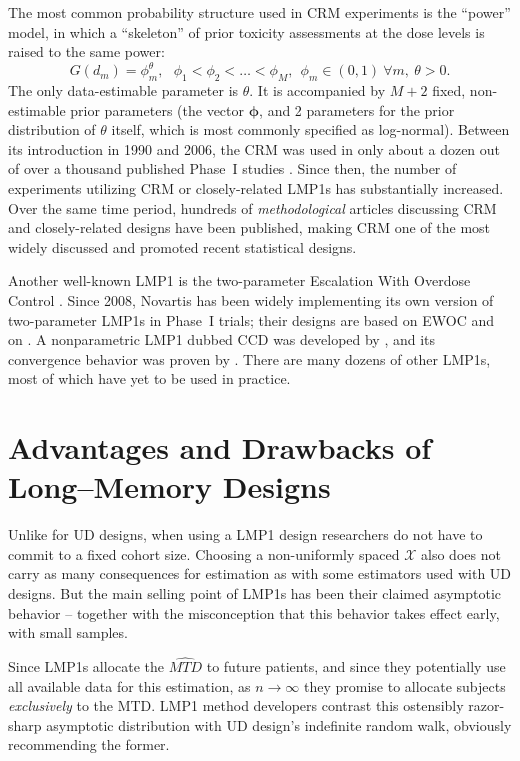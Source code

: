 The most common probability structure used in CRM experiments is the ``power'' model, in which a ``skeleton'' of prior toxicity assessments at the dose levels is raised to the same power:
\begin{equation}\label{eq:crm0}
G\left(d_m\right)=\phi_m^\theta,\ \ \ \phi_1<\phi_2<\ldots <\phi_M ,\ \ \phi_m\in(0,1) \ \forall m,\ \theta>0.
\end{equation}
The only data-estimable parameter is $\theta$. It is accompanied by $M+2$ fixed, non-estimable prior parameters (the vector $\boldsymbol{\phi}$, and 2 parameters for the prior distribution of $\theta$ itself, which is most commonly specified as log-normal). Between its introduction in 1990 and 2006, the CRM was used in only about a dozen out of over a thousand published Phase~I studies \citep{Rogat:etal:oped:2007}. Since then, the number of experiments utilizing CRM or closely-related LMP1s has substantially increased. Over the same time period, hundreds of \emph{methodological} articles discussing CRM and closely-related designs have been published, making CRM one of the most widely discussed and promoted recent statistical designs.

Another well-known LMP1 is the two-parameter Escalation With Overdose Control \citep[EWOC,][]{Babb:Roga:Roga:Zack:canc:1998}. Since 2008, Novartis has been widely implementing its own version of two-parameter LMP1s in Phase~I trials; their designs are based on EWOC and on \cite{Neunsch08}. A nonparametric LMP1 dubbed CCD was developed by \cite{Ivan:Flou:Chun:Cumu:2007}, and its convergence behavior was proven by \cite{oron:azri:hoff:dose:2011}. There are many dozens of other LMP1s, most of which have yet to be used in practice.

\section{Advantages and Drawbacks of Long--Memory Designs}

Unlike for UD designs, when using a LMP1 design researchers do not have to commit to a fixed cohort size. Choosing a non-uniformly spaced $\mathcal{X}$ also does not carry as many consequences for estimation as with some estimators used with UD designs. But the main selling point of LMP1s has been their claimed asymptotic behavior -- together with the misconception that this behavior takes effect early, with small samples.

Since LMP1s allocate the $\widehat{MTD}$ to future patients, and since they potentially use all available data for this estimation, as $n\to\infty$ they promise to allocate subjects \emph{exclusively} to the MTD. LMP1 method developers contrast this ostensibly razor-sharp asymptotic distribution with UD design's indefinite random walk, obviously recommending the former.

